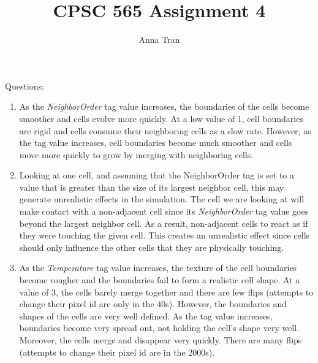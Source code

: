 \documentclass{article}
\author{Anna Tran}
\title{CPSC 565 Assignment 4}
\begin{document}
\maketitle
Questions:
\begin{enumerate}
	\item As the \emph{NeighborOrder} tag value increases, the boundaries of the cells become smoother and cells evolve more quickly. At a low value of 1, cell boundaries are rigid and cells consume their neighboring cells as a slow rate. However, as the tag value increases, cell boundaries become much smoother and cells move more quickly to grow by merging with neighboring cells.
	\item Looking at one cell, and assuming that the NeighborOrder tag is set to a value that is greater than the size of its largest neighbor cell, this may generate unrealistic effects in the simulation. The cell we are looking at will make contact with a non-adjacent cell since its \emph{NeighborOrder} tag value goes beyond the largest neighbor cell. As a result, non-adjacent cells to react as if they were touching the given cell. This creates an unrealistic effect since cells should only influence the other cells that they are physically touching.
	\item As the \emph{Temperature} tag value increases, the texture of the cell boundaries become rougher and the boundaries fail to form a realistic cell shape. At a value of 3, the cells barely merge together and there are few flips (attempts to change their pixel id are only in the 40s).  However, the boundaries and shapes of the cells are very well defined. As the tag value increases, boundaries become very spread out, not holding the cell's shape very well. Moreover, the cells merge and disappear very quickly. There are many flips (attempts to change their pixel id are in the 2000s).
\end{enumerate}
\end{document}
